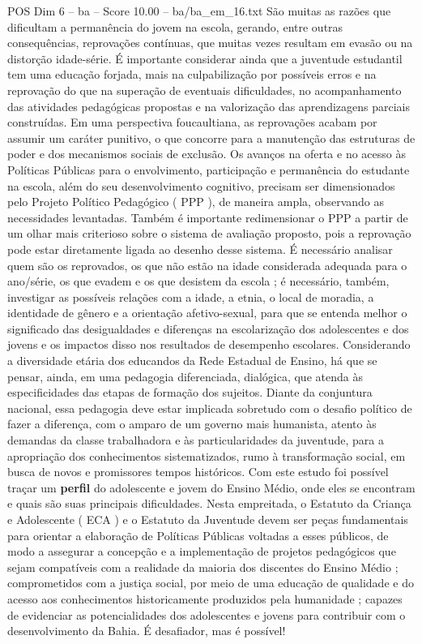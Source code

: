 \begin{textsample}{POS Dim 6 – ba – Score 10.00 – ba/ba\_em\_16.txt}
São muitas as razões que dificultam a permanência do jovem na escola, gerando, entre outras consequências, reprovações contínuas, que muitas vezes resultam em evasão ou na distorção idade-série.
É importante considerar ainda que a juventude estudantil tem uma educação forjada, mais na culpabilização por possíveis erros e na reprovação do que na superação de eventuais dificuldades, no acompanhamento das atividades pedagógicas propostas e na valorização das aprendizagens parciais construídas.
Em uma perspectiva foucaultiana, as reprovações acabam por assumir um caráter punitivo, o que concorre para a manutenção das estruturas de poder e dos mecanismos sociais de exclusão.
Os avanços na oferta e no acesso às Políticas Públicas para o envolvimento, participação e permanência do estudante na escola, além do seu desenvolvimento cognitivo, precisam ser dimensionados pelo Projeto Político Pedagógico ( PPP ), de maneira ampla, observando as necessidades levantadas.
Também é importante redimensionar o PPP a partir de um olhar mais criterioso sobre o sistema de avaliação proposto, pois a reprovação pode estar diretamente ligada ao desenho desse sistema.
É necessário analisar quem são os reprovados, os que não estão na idade considerada adequada para o ano/série, os que evadem e os que desistem da escola ; é necessário, também, investigar as possíveis relações com a idade, a etnia, o local de moradia, a identidade de gênero e a orientação afetivo-sexual, para que se entenda melhor o significado das desigualdades e diferenças na escolarização dos adolescentes e dos jovens e os impactos disso nos resultados de desempenho escolares.
Considerando a diversidade etária dos educandos da Rede Estadual de Ensino, há que se pensar, ainda, em uma pedagogia diferenciada, dialógica, que atenda às especificidades das etapas de formação dos sujeitos.
Diante da conjuntura nacional, essa pedagogia deve estar implicada sobretudo com o desafio político de fazer a diferença, com o amparo de um governo mais humanista, atento às demandas da classe trabalhadora e às particularidades da juventude, para a apropriação dos conhecimentos sistematizados, rumo à transformação social, em busca de novos e promissores tempos históricos.
Com este estudo foi possível traçar um \textbf{perfil} do adolescente e jovem do Ensino Médio, onde eles se encontram e quais são suas principais dificuldades.
Nesta empreitada, o Estatuto da Criança e Adolescente ( ECA ) e o Estatuto da Juventude devem ser peças fundamentais para orientar a elaboração de Políticas Públicas voltadas a esses públicos, de modo a assegurar a concepção e a implementação de projetos pedagógicos que sejam compatíveis com a realidade da maioria dos discentes do Ensino Médio ; comprometidos com a justiça social, por meio de uma educação de qualidade e do acesso aos conhecimentos historicamente produzidos pela humanidade ; capazes de evidenciar as potencialidades dos adolescentes e jovens para contribuir com o desenvolvimento da Bahia.
É desafiador, mas é possível!

\end{textsample}
